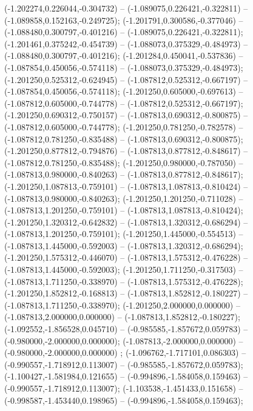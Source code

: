  (-1.202274,0.226044,-0.304732) -- (-1.089075,0.226421,-0.322811) -- (-1.089858,0.152163,-0.249725);
 (-1.201791,0.300586,-0.377046) -- (-1.088480,0.300797,-0.401216) -- (-1.089075,0.226421,-0.322811);
 (-1.201461,0.375242,-0.454739) -- (-1.088073,0.375329,-0.484973) -- (-1.088480,0.300797,-0.401216);
 (-1.201284,0.450041,-0.537836) -- (-1.087854,0.450056,-0.574118) -- (-1.088073,0.375329,-0.484973);
 (-1.201250,0.525312,-0.624945) -- (-1.087812,0.525312,-0.667197) -- (-1.087854,0.450056,-0.574118);
 (-1.201250,0.605000,-0.697613) -- (-1.087812,0.605000,-0.744778) -- (-1.087812,0.525312,-0.667197);
 (-1.201250,0.690312,-0.750157) -- (-1.087813,0.690312,-0.800875) -- (-1.087812,0.605000,-0.744778);
 (-1.201250,0.781250,-0.782578) -- (-1.087812,0.781250,-0.835488) -- (-1.087813,0.690312,-0.800875);
 (-1.201250,0.877812,-0.794876) -- (-1.087813,0.877812,-0.848617) -- (-1.087812,0.781250,-0.835488);
 (-1.201250,0.980000,-0.787050) -- (-1.087813,0.980000,-0.840263) -- (-1.087813,0.877812,-0.848617);
 (-1.201250,1.087813,-0.759101) -- (-1.087813,1.087813,-0.810424) -- (-1.087813,0.980000,-0.840263);
 (-1.201250,1.201250,-0.711028) -- (-1.087813,1.201250,-0.759101) -- (-1.087813,1.087813,-0.810424);
 (-1.201250,1.320312,-0.642832) -- (-1.087813,1.320312,-0.686294) -- (-1.087813,1.201250,-0.759101);
 (-1.201250,1.445000,-0.554513) -- (-1.087813,1.445000,-0.592003) -- (-1.087813,1.320312,-0.686294);
 (-1.201250,1.575312,-0.446070) -- (-1.087813,1.575312,-0.476228) -- (-1.087813,1.445000,-0.592003);
 (-1.201250,1.711250,-0.317503) -- (-1.087813,1.711250,-0.338970) -- (-1.087813,1.575312,-0.476228);
 (-1.201250,1.852812,-0.168813) -- (-1.087813,1.852812,-0.180227) -- (-1.087813,1.711250,-0.338970);
 (-1.201250,2.000000,0.000000) -- (-1.087813,2.000000,0.000000) -- (-1.087813,1.852812,-0.180227);
 (-1.092552,-1.856528,0.045710) -- (-0.985585,-1.857672,0.059783) -- (-0.980000,-2.000000,0.000000);
 (-1.087813,-2.000000,0.000000) -- (-0.980000,-2.000000,0.000000) ;
 (-1.096762,-1.717101,0.086303) -- (-0.990557,-1.718912,0.113007) -- (-0.985585,-1.857672,0.059783);
 (-1.100427,-1.581984,0.121655) -- (-0.994896,-1.584058,0.159463) -- (-0.990557,-1.718912,0.113007);
 (-1.103538,-1.451433,0.151658) -- (-0.998587,-1.453440,0.198965) -- (-0.994896,-1.584058,0.159463);
